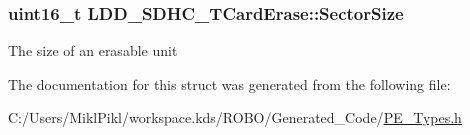 \subsubsection[{Sector\+Size}]{\setlength{\rightskip}{0pt plus 5cm}uint16\+\_\+t L\+D\+D\+\_\+\+S\+D\+H\+C\+\_\+\+T\+Card\+Erase\+::\+Sector\+Size}\label{struct_l_d_d___s_d_h_c___t_card_erase_a3c0c33e89b65f4f6bfd6043585df5486}
The size of an erasable unit 

The documentation for this struct was generated from the following file\+:\begin{DoxyCompactItemize}
\item 
C\+:/\+Users/\+Mikl\+Pikl/workspace.\+kds/\+R\+O\+B\+O/\+Generated\+\_\+\+Code/\hyperlink{_p_e___types_8h}{P\+E\+\_\+\+Types.\+h}\end{DoxyCompactItemize}
